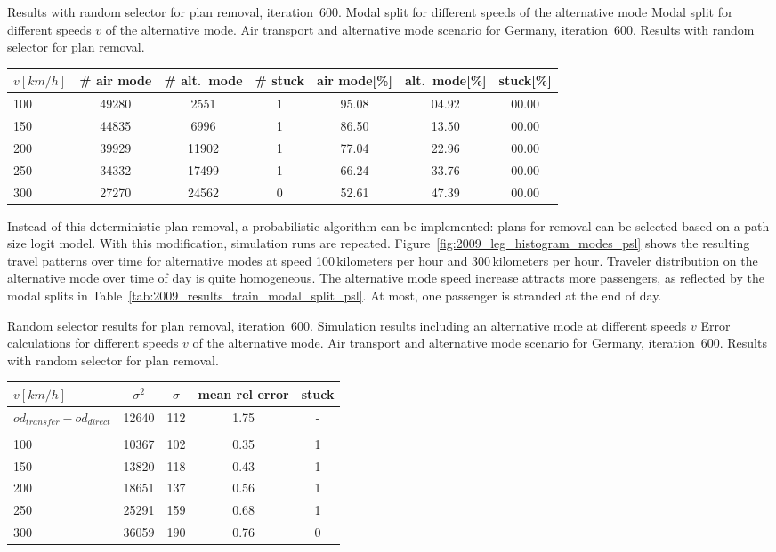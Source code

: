 %
\createtable%
{Results with random selector for plan removal, iteration~600. Modal split for different speeds of the alternative mode}%
{Modal split for different speeds $v$ of the alternative mode. %
Air transport and alternative mode scenario for Germany, iteration~600. %
Results with random selector for plan removal. %
}%
{\label{tab:2009_results_train_modal_split_psl}}%
{%
  \begin{tabular}{@{}l|ccc|ccc@{}}
		$v [km/h]$	& \# air mode  & \# alt.~mode & \# stuck & air mode[\%]  & alt.~mode[\%] & stuck[\%] \\
		\hline 
		100 & 49280 & 2551 & 1 & 95.08 & 04.92 & 00.00\\	%
		150 & 44835 & 6996 & 1 & 86.50 & 13.50 & 00.00\\	%
		200 & 39929 & 11902 & 1 & 77.04 & 22.96 & 00.00\\	%
		250 & 34332 & 17499 & 1 & 66.24 & 33.76 & 00.00\\	%
		300 & 27270 & 24562 & 0 & 52.61 & 47.39 & 00.00\\	%
	\end{tabular}
}%
{}

Instead of this deterministic plan removal, a probabilistic algorithm can be implemented: \eg plans for removal can be selected based on a path size logit model. 
With this modification, simulation runs are repeated. 
Figure~\ref{fig:2009_leg_histogram_modes_psl} shows the resulting travel patterns over time for alternative modes at speed 100\,kilometers per hour and 300\,kilometers per hour.  
Traveler distribution on the alternative mode over time of day is quite homogeneous. 
The alternative mode speed increase attracts more passengers, as 
reflected by the modal splits in Table~\ref{tab:2009_results_train_modal_split_psl}. 
At most, one passenger is stranded at the end of day. 

\createtable%
{Random selector results for plan removal, iteration~600. Simulation results including an alternative mode at different speeds $v$}%
{%
Error calculations for different speeds $v$ of the alternative mode. %
Air transport and alternative mode scenario for Germany, iteration~600. %
Results with random selector for plan removal. %
}%
{\label{tab:2009_results_alternative_mode_psl}}%
{%
  \begin{tabular}{@{}l|cccc@{}}
			$v [km/h]$ & $\sigma^2$ & $\sigma$ & mean rel error  & stuck \\
\hline
 $od_{transfer} - od_{direct}$ &  12640 & 112 & 1.75 & - \\
 \\
 100	& 10367 & 102 & 0.35 &  1 \\	%
 150	& 13820 & 118 & 0.43 &  1 \\	%
 200 & 18651 & 137 & 0.56 &  1 \\	%
 250 & 25291 & 159 & 0.68 & 1 \\	%
 300 & 36059 & 190 & 0.76 & 0 \\	%
		\end{tabular}
}%
{}

